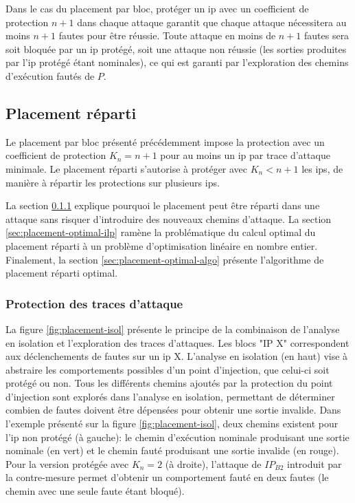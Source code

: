             Dans le cas du placement par bloc, protéger un \gls{ip} avec un coefficient de protection $n+1$ dans chaque attaque garantit que chaque attaque nécessitera au moins $n + 1$ fautes pour être réussie.
            Toute attaque en moins de $n + 1$ fautes sera soit bloquée par un \gls{ip} protégé, soit une attaque non réussie (les sorties produites par l'\gls{ip} protégé étant nominales), ce qui est garanti par l'exploration des chemins d'exécution fautés de $P$.

        \subsection{Placement réparti}
        \label{sec:placement-opti}

            Le placement par bloc présenté précédemment impose la protection avec un coefficient de protection $K_n = n + 1$ pour au moins un \gls{ip} par trace d'attaque minimale.
            Le placement réparti s'autorise à protéger avec $K_n < n + 1$ les \gls{ip}s, de manière à répartir les protections sur plusieurs \gls{ip}s.
    
            La section \ref{sec:placement-isolation} explique pourquoi le placement peut être réparti dans une attaque sans risquer d'introduire des nouveaux chemins d'attaque.
            La section \ref{sec:placement-optimal-ilp} ramène la problématique du calcul optimal du placement réparti à un problème d'optimisation linéaire en nombre entier.
            Finalement, la section \ref{sec:placement-optimal-algo} présente l'algorithme de placement réparti optimal.
        
            \subsubsection{Protection des traces d'attaque}
            \label{sec:placement-isolation}
    
                La figure \ref{fig:placement-isol} présente le principe de la combinaison de l'analyse en isolation et l'exploration des traces d'attaques.
                Les blocs "IP X" correspondent aux déclenchements de fautes sur un \gls{ip} X.
                L'analyse en isolation (en haut) vise à abstraire les comportements possibles d'un point d'injection, que celui-ci soit protégé ou non. Tous les différents chemins ajoutés par la protection du point d'injection sont explorés dans l'analyse en isolation, permettant de déterminer combien de fautes doivent être dépensées pour obtenir une sortie invalide.  
                Dans l'exemple présenté sur la figure \ref{fig:placement-isol}, deux chemins existent pour l'\gls{ip} non protégé (à gauche): le chemin d'exécution nominale produisant une sortie nominale (en vert) et le chemin fauté produisant une sortie invalide (en rouge).
                Pour la version protégée avec $K_n = 2$ (à droite), l'attaque de $IP_{B2}$ introduit par la contre-mesure permet d'obtenir un comportement fauté en deux fautes (le chemin avec une seule faute étant bloqué).
    
